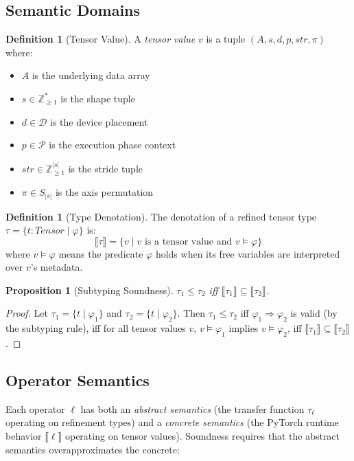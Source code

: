 \documentclass[10pt]{article}
\newcommand{\sem}[1]{\llbracket #1 \rrbracket}
\theoremstyle{plain}
\newtheorem{proposition}[theorem]{Proposition}
\theoremstyle{definition}
\newtheorem{definition}[theorem]{Definition}
\theoremstyle{remark}
\begin{document}
\subsection{Semantic Domains}

\begin{definition}[Tensor Value]
A \emph{tensor value} $v$ is a tuple
$(A, s, d, p, \mathit{str}, \pi)$ where:
\begin{itemize}[nosep]
  \item $A$ is the underlying data array
  \item $s \in \mathbb{Z}_{\geq 1}^*$ is the shape tuple
  \item $d \in \mathcal{D}$ is the device placement
  \item $p \in \mathcal{P}$ is the execution phase context
  \item $\mathit{str} \in \mathbb{Z}_{\geq 1}^{|s|}$ is the stride tuple
  \item $\pi \in S_{|s|}$ is the axis permutation
\end{itemize}
\end{definition}

\begin{definition}[Type Denotation]
The denotation of a refined tensor type
$\tau = \{t : \mathit{Tensor} \mid \varphi\}$ is:
\[
  \sem{\tau} = \{ v \mid v \text{ is a tensor value and }
    v \models \varphi \}
\]
where $v \models \varphi$ means the predicate $\varphi$ holds when
its free variables are interpreted over $v$'s metadata.
\end{definition}

\begin{proposition}[Subtyping Soundness]
$\tau_1 \leq \tau_2$ iff $\sem{\tau_1} \subseteq \sem{\tau_2}$.
\end{proposition}

\begin{proof}
Let $\tau_1 = \{t \mid \varphi_1\}$ and $\tau_2 = \{t \mid \varphi_2\}$.
Then $\tau_1 \leq \tau_2$ iff $\varphi_1 \Rightarrow \varphi_2$ is
valid (by the subtyping rule), iff for all tensor values $v$,
$v \models \varphi_1$ implies $v \models \varphi_2$, iff
$\sem{\tau_1} \subseteq \sem{\tau_2}$.
\end{proof}

\subsection{Operator Semantics}

Each operator $\ell$ has both an \emph{abstract semantics}
(the transfer function $\tau_\ell$ operating on refinement types)
and a \emph{concrete semantics} (the PyTorch runtime behavior
$\sem{\ell}$ operating on tensor values).  Soundness requires
that the abstract semantics overapproximates the concrete:
\end{document}
